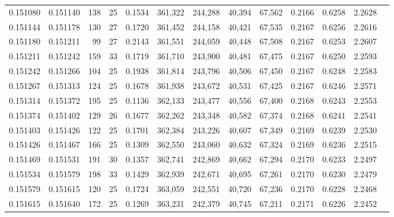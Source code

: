 \begin{tabular}{rrrrrrrrrrrrr}
0.151080 & 0.151140 & 138 &  25 &                                     0.1534 & 361,322 & 244,288 &  40,394 &  67,562 & 0.2166 & 0.6258 & 2.2628 \\
0.151144 & 0.151178 & 130 &  27 &                                     0.1720 & 361,452 & 244,158 &  40,421 &  67,535 & 0.2167 & 0.6256 & 2.2616 \\
0.151180 & 0.151211 &  99 &  27 &                                     0.2143 & 361,551 & 244,059 &  40,448 &  67,508 & 0.2167 & 0.6253 & 2.2607 \\
0.151211 & 0.151242 & 159 &  33 &                                     0.1719 & 361,710 & 243,900 &  40,481 &  67,475 & 0.2167 & 0.6250 & 2.2593 \\
0.151242 & 0.151266 & 104 &  25 &                                     0.1938 & 361,814 & 243,796 &  40,506 &  67,450 & 0.2167 & 0.6248 & 2.2583 \\
0.151267 & 0.151313 & 124 &  25 &                                     0.1678 & 361,938 & 243,672 &  40,531 &  67,425 & 0.2167 & 0.6246 & 2.2571 \\
0.151314 & 0.151372 & 195 &  25 &                                     0.1136 & 362,133 & 243,477 &  40,556 &  67,400 & 0.2168 & 0.6243 & 2.2553 \\
0.151374 & 0.151402 & 129 &  26 &                                     0.1677 & 362,262 & 243,348 &  40,582 &  67,374 & 0.2168 & 0.6241 & 2.2541 \\
0.151403 & 0.151426 & 122 &  25 &                                     0.1701 & 362,384 & 243,226 &  40,607 &  67,349 & 0.2169 & 0.6239 & 2.2530 \\
0.151426 & 0.151467 & 166 &  25 &                                     0.1309 & 362,550 & 243,060 &  40,632 &  67,324 & 0.2169 & 0.6236 & 2.2515 \\
0.151469 & 0.151531 & 191 &  30 &                                     0.1357 & 362,741 & 242,869 &  40,662 &  67,294 & 0.2170 & 0.6233 & 2.2497 \\
0.151534 & 0.151579 & 198 &  33 &                                     0.1429 & 362,939 & 242,671 &  40,695 &  67,261 & 0.2170 & 0.6230 & 2.2479 \\
0.151579 & 0.151615 & 120 &  25 &                                     0.1724 & 363,059 & 242,551 &  40,720 &  67,236 & 0.2170 & 0.6228 & 2.2468 \\
0.151615 & 0.151640 & 172 &  25 &                                     0.1269 & 363,231 & 242,379 &  40,745 &  67,211 & 0.2171 & 0.6226 & 2.2452 \\

\end{tabular}
